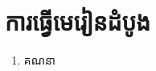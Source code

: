 \documentclass[11pt,a4paper]{structures/structure} %
\begin{document}
	\chapter{ការធ្វើមេរៀនដំបូង}
	\begin{enumerate}[I]
		\item គណនា
	\end{enumerate}
\end{document}
